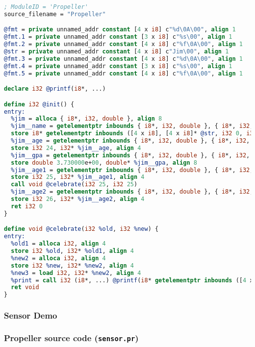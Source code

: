 \begin{lstlisting}[language=llvm,backgroundcolor=\color{backgroundcolor}]
; ModuleID = 'Propeller'
source_filename = "Propeller"

@fmt = private unnamed_addr constant [4 x i8] c"%d\0A\00", align 1
@fmt.1 = private unnamed_addr constant [3 x i8] c"%s\00", align 1
@fmt.2 = private unnamed_addr constant [4 x i8] c"%f\0A\00", align 1
@str = private unnamed_addr constant [4 x i8] c"Jim\00", align 1
@fmt.3 = private unnamed_addr constant [4 x i8] c"%d\0A\00", align 1
@fmt.4 = private unnamed_addr constant [3 x i8] c"%s\00", align 1
@fmt.5 = private unnamed_addr constant [4 x i8] c"%f\0A\00", align 1

declare i32 @printf(i8*, ...)

define i32 @init() {
entry:
  %jim = alloca { i8*, i32, double }, align 8
  %jim__name = getelementptr inbounds { i8*, i32, double }, { i8*, i32, double }* %jim, i32 0, i32 0
  store i8* getelementptr inbounds ([4 x i8], [4 x i8]* @str, i32 0, i32 0), i8** %jim__name, align 8
  %jim__age = getelementptr inbounds { i8*, i32, double }, { i8*, i32, double }* %jim, i32 0, i32 1
  store i32 24, i32* %jim__age, align 4
  %jim__gpa = getelementptr inbounds { i8*, i32, double }, { i8*, i32, double }* %jim, i32 0, i32 2
  store double 3.730000e+00, double* %jim__gpa, align 8
  %jim__age1 = getelementptr inbounds { i8*, i32, double }, { i8*, i32, double }* %jim, i32 0, i32 1
  store i32 25, i32* %jim__age1, align 4
  call void @celebrate(i32 25, i32 25)
  %jim__age2 = getelementptr inbounds { i8*, i32, double }, { i8*, i32, double }* %jim, i32 0, i32 1
  store i32 26, i32* %jim__age2, align 4
  ret i32 0
}

define void @celebrate(i32 %old, i32 %new) {
entry:
  %old1 = alloca i32, align 4
  store i32 %old, i32* %old1, align 4
  %new2 = alloca i32, align 4
  store i32 %new, i32* %new2, align 4
  %new3 = load i32, i32* %new2, align 4
  %print = call i32 (i8*, ...) @printf(i8* getelementptr inbounds ([4 x i8], [4 x i8]* @fmt.3, i32 0, i32 0), i32 %new3)
  ret void
}
\end{lstlisting}

\subsubsection{Sensor Demo}

\subsubsection{Propeller source code (\texttt{sensor.pr})}

